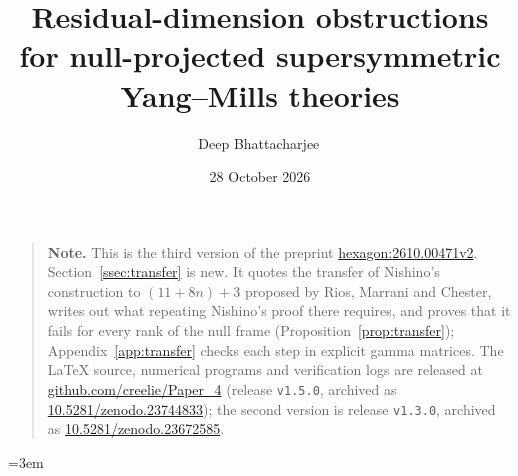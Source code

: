 \documentclass[11pt,a4paper,reqno]{amsart}
\title[Residual-dimension obstructions for null-projected SYM theories]{Residual-dimension obstructions for null-projected supersymmetric Yang--Mills theories}
\author{Deep Bhattacharjee\,\orcidlink{0000-0003-0466-750X}}
\date{28 October 2026}
\numberwithin{equation}{section}
\begin{document}
\begin{abstract}
\itshape

\end{abstract}

\maketitle

\begin{quote}
\small\sloppy
\noindent\textbf{Note.} This is the third version of the preprint \href{https://hexagonmath.org/2610.00471v2}{hexagon:2610.00471v2}. Section~\ref{ssec:transfer} is new. It quotes the transfer of Nishino's construction to $(11+8n)+3$ proposed by Rios, Marrani and Chester, writes out what repeating Nishino's proof there requires, and proves that it fails for every rank of the null frame (Proposition~\ref{prop:transfer}); Appendix~\ref{app:transfer} checks each step in explicit gamma matrices. The \LaTeX{} source, numerical programs and verification logs are released at \href{https://github.com/creelie/Paper_4}{github.com/creelie/Paper\_4} (release \texttt{v1.5.0}, archived as \href{https://doi.org/10.5281/zenodo.23744833}{10.5281/zenodo.23744833}); the second version is release \texttt{v1.3.0}, archived as \href{https://doi.org/10.5281/zenodo.23672585}{10.5281/zenodo.23672585}.
\end{quote}


\begingroup\sloppy\emergencystretch=3em

\endgroup
\end{document}
